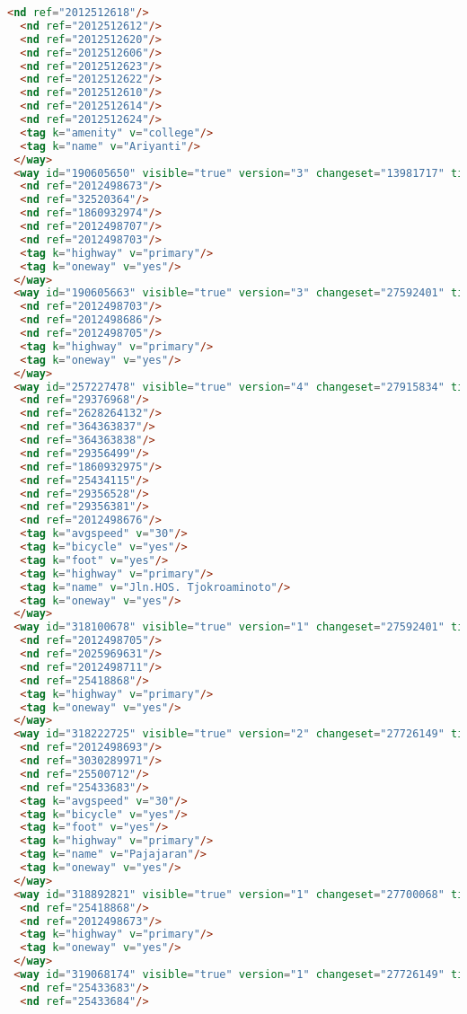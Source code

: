 \begin{lstlisting}[language=HTML,basicstyle=\tiny,caption=test.xml]
  <nd ref="2012512618"/>
  <nd ref="2012512612"/>
  <nd ref="2012512620"/>
  <nd ref="2012512606"/>
  <nd ref="2012512623"/>
  <nd ref="2012512622"/>
  <nd ref="2012512610"/>
  <nd ref="2012512614"/>
  <nd ref="2012512624"/>
  <tag k="amenity" v="college"/>
  <tag k="name" v="Ariyanti"/>
 </way>
 <way id="190605650" visible="true" version="3" changeset="13981717" timestamp="2012-11-22T06:24:04Z" user="yudiwbs" uid="268765">
  <nd ref="2012498673"/>
  <nd ref="32520364"/>
  <nd ref="1860932974"/>
  <nd ref="2012498707"/>
  <nd ref="2012498703"/>
  <tag k="highway" v="primary"/>
  <tag k="oneway" v="yes"/>
 </way>
 <way id="190605663" visible="true" version="3" changeset="27592401" timestamp="2014-12-20T16:49:58Z" user="gnocin" uid="2526082">
  <nd ref="2012498703"/>
  <nd ref="2012498686"/>
  <nd ref="2012498705"/>
  <tag k="highway" v="primary"/>
  <tag k="oneway" v="yes"/>
 </way>
 <way id="257227478" visible="true" version="4" changeset="27915834" timestamp="2015-01-04T17:55:47Z" user="isonpurba" uid="2552445">
  <nd ref="29376968"/>
  <nd ref="2628264132"/>
  <nd ref="364363837"/>
  <nd ref="364363838"/>
  <nd ref="29356499"/>
  <nd ref="1860932975"/>
  <nd ref="25434115"/>
  <nd ref="29356528"/>
  <nd ref="29356381"/>
  <nd ref="2012498676"/>
  <tag k="avgspeed" v="30"/>
  <tag k="bicycle" v="yes"/>
  <tag k="foot" v="yes"/>
  <tag k="highway" v="primary"/>
  <tag k="name" v="Jln.HOS. Tjokroaminoto"/>
  <tag k="oneway" v="yes"/>
 </way>
 <way id="318100678" visible="true" version="1" changeset="27592401" timestamp="2014-12-20T16:49:54Z" user="gnocin" uid="2526082">
  <nd ref="2012498705"/>
  <nd ref="2025969631"/>
  <nd ref="2012498711"/>
  <nd ref="25418868"/>
  <tag k="highway" v="primary"/>
  <tag k="oneway" v="yes"/>
 </way>
 <way id="318222725" visible="true" version="2" changeset="27726149" timestamp="2014-12-27T09:47:32Z" user="gnocin" uid="2526082">
  <nd ref="2012498693"/>
  <nd ref="3030289971"/>
  <nd ref="25500712"/>
  <nd ref="25433683"/>
  <tag k="avgspeed" v="30"/>
  <tag k="bicycle" v="yes"/>
  <tag k="foot" v="yes"/>
  <tag k="highway" v="primary"/>
  <tag k="name" v="Pajajaran"/>
  <tag k="oneway" v="yes"/>
 </way>
 <way id="318892821" visible="true" version="1" changeset="27700068" timestamp="2014-12-26T00:34:22Z" user="gnocin" uid="2526082">
  <nd ref="25418868"/>
  <nd ref="2012498673"/>
  <tag k="highway" v="primary"/>
  <tag k="oneway" v="yes"/>
 </way>
 <way id="319068174" visible="true" version="1" changeset="27726149" timestamp="2014-12-27T09:47:29Z" user="gnocin" uid="2526082">
  <nd ref="25433683"/>
  <nd ref="25433684"/>

\end{lstlisting}
